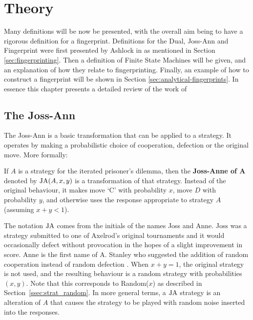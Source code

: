 
\chapter{Theory}\label{cha:theory}

Many definitions will be now be presented, with the overall aim being to have a rigorous definition for a fingerprint.
Definitions for the Dual, Joss-Ann and Fingerprint were first presented by Ashlock in \cite{Ashlock2004} as mentioned in Section \ref{sec:fingerprinting}.
Then a definition of Finite State Machines will be given, and an explanation of how they relate to fingerprinting.
Finally, an example of how to construct a fingerprint will be shown in Section \ref{sec:analytical-fingerprints}.
In essence this chapter presents a detailed review of the work of
\cite{Ashlock...}  %

\section{The Joss-Ann}\label{sec:joss-ann}
The Joss-Ann is a basic transformation that can be applied to a strategy.
It operates by making a probabilistic choice of cooperation, defection or the original move.
More formally:

\begin{definition}\label{def:joss-ann}
If $A$ is a strategy for the iterated prisoner's dilemma, then the
\textbf{Joss-Anne of A} denoted by $\text{JA}(A, x, y)$ is a transformation of that strategy.
Instead of the original behaviour, it makes move `C' with probability $x$, move
$D$ with probability $y$, and otherwise uses the response appropriate to
strategy $A$ (assuming $x+y < 1$).
\end{definition}

The notation $\text{JA}$ comes from the initials of the names Joss and Anne.
Joss was a strategy submitted to one of Axelrod’s original tournaments and it would occasionally defect without provocation in the hopes of a slight improvement in score.
Anne is the first name of A. Stanley who suggested the addition of random cooperation instead of random defection \cite{Ashlock2008}.
When $x + y = 1$, the original strategy is not used, and the resulting behaviour
is a random strategy with probabilities $(x, y)$. Note that this corresponds to
Random($x$) as described in Section~\ref{ssec:strat_random}.
In more general terms, a $\text{JA}$ strategy is an alteration of $A$ that causes the strategy to be played with random noise inserted into the responses.

